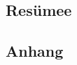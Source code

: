 \documentclass[12pt,a4paper,titlepage,listof=totoc,bibliography=totoc,chapteratlists=0pt]{scrreprt}
\begin{document}
\begin{spacing}{1}
    \chapter{Resümee}
\end{spacing}


\begin{spacing}{1}
    \chapter{Anhang}
\end{spacing}


\setcounter{page}{\value{RPages}}

\glsnogroupskiptrue
\printglossary[title=Glossar,toctitle=Glossar] %
\listoffigures
\listoftables
\lstlistoflistings
\appendix
\newpage
{}
\end{document}
